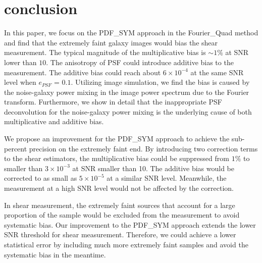 \documentclass[twocolumn]{aastex62}
\begin{document}
\section{conclusion}
In this paper, we focus on the PDF\_SYM approach in the Fourier\_Quad method and find that the extremely faint galaxy images would bias the shear measurement. The typical magnitude of the multiplicative bias is $\sim1\%$ at SNR lower than $10$. The anisotropy of PSF could introduce additive bias to the measurement. The additive bias could reach about $6\times10^{-4}$ at the same SNR level when $e_{PSF} $ = $0.1$. Utilizing image simulation, we find the bias is caused by the noise-galaxy power mixing in the image power spectrum due to the Fourier transform. Furthermore, we show in detail that the inappropriate PSF deconvolution for the noise-galaxy power mixing is the underlying cause of both multiplicative and additive bias. 

We propose an improvement for the PDF\_SYM approach to achieve the sub-percent precision on the extremely faint end. By introducing two correction terms to the shear estimators, the multiplicative bias could be suppressed from $1\%$ to smaller than $3\times10^{-3}$ at SNR smaller than 10. The additive bias would be corrected to as small as $5\times 10^{-5}$ at a similar SNR level. Meanwhile, the measurement at a high SNR level would not be affected by the correction. 

In shear measurement, the extremely faint sources that account for a large proportion of the sample would be excluded from the measurement to avoid systematic bias. Our improvement to the PDF\_SYM approach extends the lower SNR threshold for shear measurement. Therefore, we could achieve a lower statistical error by including much more extremely faint samples and avoid the systematic bias in the meantime. 
\end{document}
